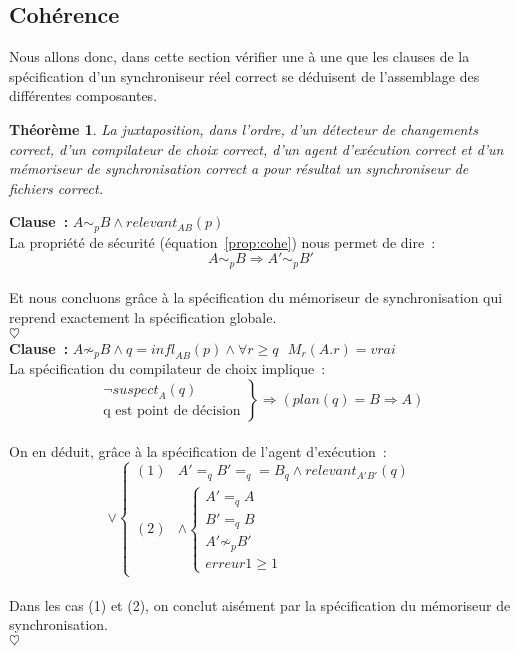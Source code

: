 \documentclass[11pt]{report}
\newtheorem{theor}{Th\'eor\`eme}
\newcommand{\sus}[1]{\ensuremath{\mathit{suspect}_{#1}}}
\newcommand{\clause}[2]{\textbf{Clause~:} $#1$\\
#2\\
$\heartsuit$\\}
\begin{document}
{\subsection{Coh\'erence}
Nous allons donc, dans cette section v\'erifier une \`a une que les clauses de la 
sp\'ecification d'un synchroniseur r\'eel correct se d\'eduisent de l'assemblage
des diff\'erentes composantes.\\
\begin{theor}
La juxtaposition, dans l'ordre, d'un d\'etecteur de changements correct,
d'un compilateur de choix correct, d'un agent d'ex\'ecution correct et
d'un m\'emoriseur de synchronisation correct a pour r\'esultat un 
synchroniseur de fichiers correct.
\end{theor}
\clause{A \sim_{p} B \wedge \mathit{relevant}_{AB}(p)}{
La propri\'et\'e de s\'ecurit\'e (\'equation~\ref{prop:cohe}) nous permet de dire~:
\[
A \sim_{p} B \Rightarrow A' \sim_{p} B' 
\] \\
Et nous concluons gr\^ace \`a la sp\'ecification du m\'emoriseur de
synchronisation qui reprend exactement la sp\'ecification globale.
}
\clause{A \not\sim_{p} B \wedge q = \mathit{infl}_{AB}(p) \wedge 
\forall r \geq q \mbox{\ } M_{r}(A.r) = vrai}{
La sp\'ecification du compilateur de choix implique~:\\
\[
  \left.
  \begin{array}{l}
   \neg \sus{A}(q)\\
   \mbox{q est point de d\'ecision}
  \end{array} \right\} \Rightarrow  (\mathit{plan}(q) = B \Rightarrow A) 
\] \\
On en d\'eduit, gr\^ace \`a la sp\'ecification de l'agent d'ex\'ecution~:\\
\[ \vee \left\{
  \begin{array}{ll}
   (1) & A' =_{q} B' =_{q} = B_{q} \wedge \mathit{relevant}_{A'B'}(q) \\
   (2) & \wedge \left\{ 
  \begin{array}{l}
   A' =_{q} A\\ 
   B' =_{q} B\\
   A' \not\sim_{p} B'\\
   \mathit{erreur1} \geq 1
  \end{array} \right. 
  \end{array} \right. 
\] \\
Dans les cas (1) et (2), on conclut ais\'ement par la sp\'ecification du
m\'emoriseur de synchronisation.}
}
\end{document}
